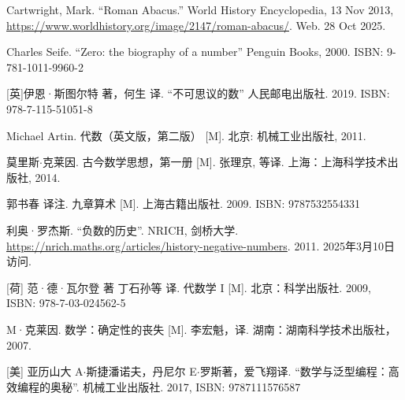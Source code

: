 Cartwright, Mark. ``Roman Abacus.'' World History Encyclopedia, 13 Nov 2013, \url{https://www.worldhistory.org/image/2147/roman-abacus/}. Web. 28 Oct 2025.

Charles Seife. ``Zero: the biography of a number'' Penguin Books, 2000. ISBN: 9-781-1011-9960-2

[英]伊恩·斯图尔特 著，何生 译. ``不可思议的数'' 人民邮电出版社. 2019. ISBN: 978-7-115-51051-8

Michael Artin. 代数（英文版，第二版） [M]. 北京: 机械工业出版社, 2011. %

莫里斯$\cdot$克莱因. 古今数学思想，第一册 [M]. 张理京, 等译. 上海：上海科学技术出版社, 2014. %

郭书春 译注. 九章算术 [M]. 上海古籍出版社. 2009. ISBN: 9787532554331

利奥·罗杰斯. ``负数的历史''. NRICH, 剑桥大学. \url{https://nrich.maths.org/articles/history-negative-numbers}. 2011. 2025年3月10日访问.


[荷] 范·德·瓦尔登 著 丁石孙等 译. 代数学 I [M]. 北京：科学出版社. 2009, ISBN: 978-7-03-024562-5

M·克莱因. 数学：确定性的丧失 [M]. 李宏魁，译. 湖南：湖南科学技术出版社，2007. %

[美] 亚历山大 A$\cdot$斯捷潘诺夫，丹尼尔 E$\cdot$罗斯著，爱飞翔译. ``数学与泛型编程：高效编程的奥秘''. 机械工业出版社. 2017, ISBN: 9787111576587
